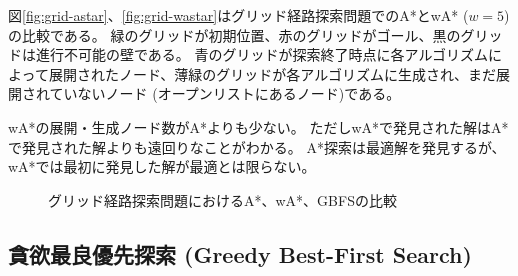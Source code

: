 図\ref{fig:grid-astar}、\ref{fig:grid-wastar}はグリッド経路探索問題でのA*とwA* ($w=5$)の比較である。
緑のグリッドが初期位置、赤のグリッドがゴール、黒のグリッドは進行不可能の壁である。
青のグリッドが探索終了時点に各アルゴリズムによって展開されたノード、薄緑のグリッドが各アルゴリズムに生成され、まだ展開されていないノード (オープンリストにあるノード)である。

wA*の展開・生成ノード数がA*よりも少ない。
ただしwA*で発見された解はA*で発見された解よりも遠回りなことがわかる。
A*探索は最適解を発見するが、wA*では最初に発見した解が最適とは限らない。

\begin{figure}
  \centering
   \hspace{4pt}
   \hspace{4pt}
  \caption{グリッド経路探索問題におけるA*、wA*、GBFSの比較}
  \label{fig:grid-comparison}
\end{figure}

\subsection{貪欲最良優先探索 (Greedy Best-First Search)}
\label{sec:greedy-best-first-search}


